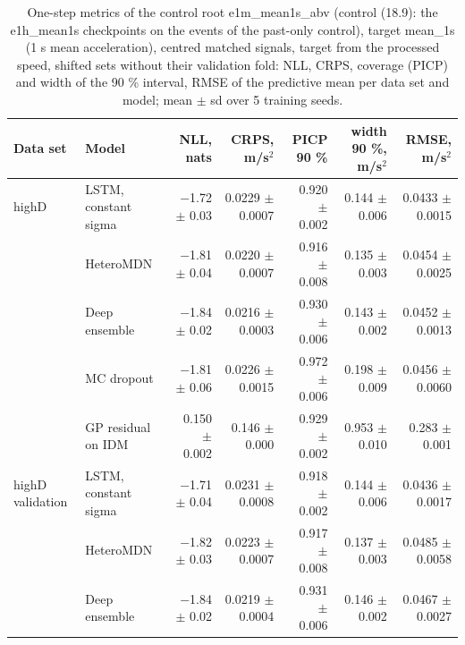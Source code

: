\begin{table}[htbp]
\centering
\footnotesize
\caption{One-step metrics of the control root e1m\_mean1s\_abv (control (18.9): the e1h\_mean1s checkpoints on the events of the past-only control), target mean\_1s (1 s mean acceleration), centred matched signals, target from the processed speed, shifted sets without their validation fold: NLL, CRPS, coverage (PICP) and width of the 90 \% interval, RMSE of the predictive mean per data set and model; mean $\pm$ sd over 5 training seeds.}
\label{tab:t1-one-step--matched-abv--mean-1s}
\begin{tabular}{llrrrrr}
\toprule
Data set & Model & NLL, nats & CRPS, m/s$^2$ & PICP 90 \% & width 90 \%, m/s$^2$ & RMSE, m/s$^2$ \\
\midrule
highD & LSTM, constant sigma & $-$1.72 $\pm$ 0.03 & 0.0229 $\pm$ 0.0007 & 0.920 $\pm$ 0.002 & 0.144 $\pm$ 0.006 & 0.0433 $\pm$ 0.0015 \\
 & HeteroMDN & $-$1.81 $\pm$ 0.04 & 0.0220 $\pm$ 0.0007 & 0.916 $\pm$ 0.008 & 0.135 $\pm$ 0.003 & 0.0454 $\pm$ 0.0025 \\
 & Deep ensemble & $-$1.84 $\pm$ 0.02 & 0.0216 $\pm$ 0.0003 & 0.930 $\pm$ 0.006 & 0.143 $\pm$ 0.002 & 0.0452 $\pm$ 0.0013 \\
 & MC dropout & $-$1.81 $\pm$ 0.06 & 0.0226 $\pm$ 0.0015 & 0.972 $\pm$ 0.006 & 0.198 $\pm$ 0.009 & 0.0456 $\pm$ 0.0060 \\
 & GP residual on IDM & 0.150 $\pm$ 0.002 & 0.146 $\pm$ 0.000 & 0.929 $\pm$ 0.002 & 0.953 $\pm$ 0.010 & 0.283 $\pm$ 0.001 \\
\midrule
highD validation & LSTM, constant sigma & $-$1.71 $\pm$ 0.04 & 0.0231 $\pm$ 0.0008 & 0.918 $\pm$ 0.002 & 0.144 $\pm$ 0.006 & 0.0436 $\pm$ 0.0017 \\
 & HeteroMDN & $-$1.82 $\pm$ 0.03 & 0.0223 $\pm$ 0.0007 & 0.917 $\pm$ 0.008 & 0.137 $\pm$ 0.003 & 0.0485 $\pm$ 0.0058 \\
 & Deep ensemble & $-$1.84 $\pm$ 0.02 & 0.0219 $\pm$ 0.0004 & 0.931 $\pm$ 0.006 & 0.146 $\pm$ 0.002 & 0.0467 $\pm$ 0.0027 \\

\end{tabular}
\end{table}
